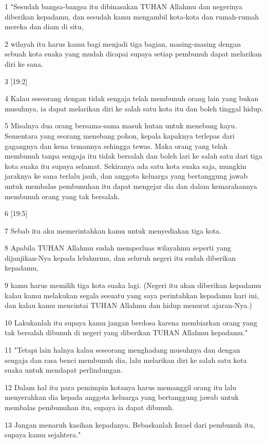 \par 1 "Sesudah bangsa-bangsa itu dibinasakan TUHAN Allahmu dan negerinya diberikan kepadamu, dan sesudah kamu mengambil kota-kota dan rumah-rumah mereka dan diam di situ,
\par 2 wilayah itu harus kamu bagi menjadi tiga bagian, masing-masing dengan sebuah kota suaka yang mudah dicapai supaya setiap pembunuh dapat melarikan diri ke sana.
\par 3 [19:2]
\par 4 Kalau seseorang dengan tidak sengaja telah membunuh orang lain yang bukan musuhnya, ia dapat melarikan diri ke salah satu kota itu dan boleh tinggal hidup.
\par 5 Misalnya dua orang bersama-sama masuk hutan untuk menebang kayu. Sementara yang seorang menebang pohon, kepala kapaknya terlepas dari gagangnya dan kena temannya sehingga tewas. Maka orang yang telah membunuh tanpa sengaja itu tidak bersalah dan boleh lari ke salah satu dari tiga kota suaka itu supaya selamat. Sekiranya ada satu kota suaka saja, mungkin jaraknya ke sana terlalu jauh, dan anggota keluarga yang bertanggung jawab untuk membalas pembunuhan itu dapat mengejar dia dan dalam kemarahannya membunuh orang yang tak bersalah.
\par 6 [19:5]
\par 7 Sebab itu aku memerintahkan kamu untuk menyediakan tiga kota.
\par 8 Apabila TUHAN Allahmu sudah memperluas wilayahmu seperti yang dijanjikan-Nya kepada leluhurmu, dan seluruh negeri itu sudah diberikan kepadamu,
\par 9 kamu harus memilih tiga kota suaka lagi. (Negeri itu akan diberikan kepadamu kalau kamu melakukan segala sesuatu yang saya perintahkan kepadamu hari ini, dan kalau kamu mencintai TUHAN Allahmu dan hidup menurut ajaran-Nya.)
\par 10 Lakukanlah itu supaya kamu jangan berdosa karena membiarkan orang yang tak bersalah dibunuh di negeri yang diberikan TUHAN Allahmu kepadamu."
\par 11 "Tetapi lain halnya kalau seseorang menghadang musuhnya dan dengan sengaja dan rasa benci membunuh dia, lalu melarikan diri ke salah satu kota suaka untuk mendapat perlindungan.
\par 12 Dalam hal itu para pemimpin kotanya harus memanggil orang itu lalu menyerahkan dia kepada anggota keluarga yang bertanggung jawab untuk membalas pembunuhan itu, supaya ia dapat dibunuh.
\par 13 Jangan menaruh kasihan kepadanya. Bebaskanlah Israel dari pembunuh itu, supaya kamu sejahtera."
